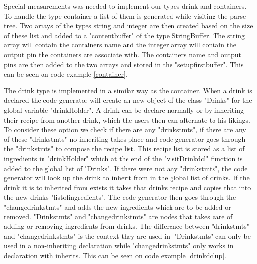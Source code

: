 
Special measurements was needed to implement our types drink and containers. To handle the type container a list of them is generated while visiting the parse tree. Two arrays of the types string and integer are then created based on the size of these list and added to a "contentbuffer" of the type StringBuffer. The string array will contain the containers name and the integer array will contain the output pin the containers are associate with. The containers name and output pins are then added to the two arrays and stored in the "setupfirstbuffer". This can be seen on code example \ref{container}.


The drink type is implemented in a similar way as the container. When a drink is declared the code generator will create an new object of the class "Drinks" for the global variable "drinkHolder". A drink can be declare normally or by inheriting their recipe from another drink, which the users then can alternate to his likings. To consider these option we check if there are any "drinkstmts", if there are any of these "drinkstmts" no inheriting takes place and code generator goes through the "drinkstmts" to compose the recipe list. This recipe list is stored as a list of ingredients in "drinkHolder" which at the end of the "visitDrinkdcl" function is added to the global list of "Drinks". If there were not any "drinkstmts", the code generator will look up the drink to inherit from in the global list of drinks. If the drink it is to inherited from exists it takes that drinks recipe and copies that into the new drinks "listofingredients". The code generator then goes through the "changedrinkstmts" and adds the new ingredients which are to be added or removed. "Drinkstmts" and "changedrinkstmts" are nodes that takes care of adding or removing ingredients from drinks. The difference between "drinkstmts" and "changedrinkstmts" is the context they are used in. "Drinkstmts" can only be used in a non-inheriting declaration while "changedrinkstmts" only works in declaration with inherits. This can be seen on code example \ref{drinkdclup}.



